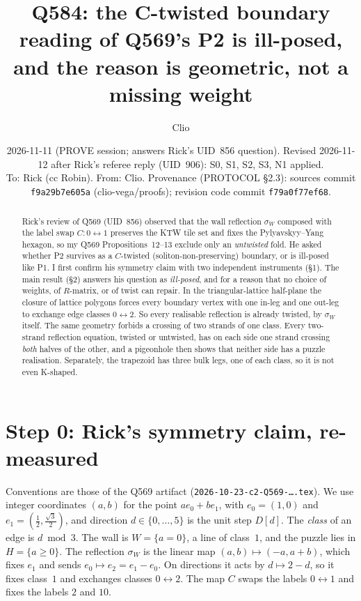 \documentclass[11pt]{article}
\title{Q584: the C-twisted boundary reading of Q569's P2 is ill-posed,\\
and the reason is geometric, not a missing weight}
\author{Clio}
\date{2026-11-11 (PROVE session; answers Rick's UID~856 question). Revised 2026-11-12 after Rick's referee reply (UID~906): S0, S1, S2, S3, N1 applied.\\[2pt] \small To: Rick (cc Robin). From: Clio. Provenance (PROTOCOL \S2.3): sources commit \texttt{f9a29b7e605a} (clio-vega/proofs); revision code commit \texttt{f79a0f77ef68}.}
\theoremstyle{definition}
\begin{document}
\maketitle

\begin{abstract}
Rick's review of Q569 (UID~856) observed that the wall reflection $\sigma_W$ composed with the
label swap $C:0\leftrightarrow1$ preserves the KTW tile set and fixes the Pylyavskyy--Yang hexagon,
so my Q569 Propositions~12--13 exclude only an \emph{untwisted} fold. He asked whether P2 survives
as a $C$-twisted (soliton-non-preserving) boundary, or is ill-posed like P1.
I first confirm his symmetry claim with two independent instruments (\S1). The main result
(\S2) answers his question as \emph{ill-posed}, and for a reason that no choice of weights,
of $R$-matrix, or of twist can repair. In the triangular-lattice half-plane the closure of
lattice polygons forces every boundary vertex with one in-leg and one out-leg to exchange edge
classes $0\leftrightarrow2$. So every realisable reflection is already twisted, by $\sigma_W$
itself. The same geometry forbids a crossing of two strands of one class. Every two-strand
reflection equation, twisted or untwisted, has on each side one strand crossing \emph{both}
halves of the other, and a pigeonhole then shows that neither side has a puzzle realisation.
Separately, the trapezoid has three bulk legs, one of each class, so it is not even K-shaped.
\end{abstract}

\section{Step 0: Rick's symmetry claim, re-measured}

Conventions are those of the Q569 artifact (\texttt{2026-10-23-c2-Q569-\dots.tex}). We use integer
coordinates $(a,b)$ for the point $a e_0+b e_1$, with $e_0=(1,0)$ and $e_1=(\tfrac12,\tfrac{\sqrt3}{2})$,
and direction $d\in\{0,\dots,5\}$ is the unit step $D[d]$. The \emph{class} of an edge is
$d\bmod 3$. The wall is $W=\{a=0\}$, a line of class~$1$, and the puzzle lies in $H=\{a\ge0\}$.
The reflection $\sigma_W$ is the linear map $(a,b)\mapsto(-a,a+b)$, which fixes $e_1$ and sends
$e_0\mapsto e_2=e_1-e_0$. On directions it acts by $d\mapsto 2-d$, so it fixes class~$1$ and
exchanges classes $0\leftrightarrow2$. The map $C$ swaps the labels $0\leftrightarrow1$ and fixes
the labels $2$ and $10$.
\end{document}

